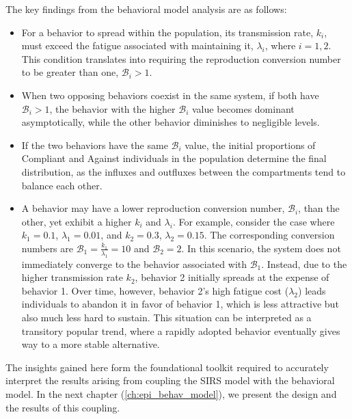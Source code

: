 The key findings from the behavioral model analysis are as follows:  
\begin{itemize}
	\item For a behavior to spread within the population, its transmission rate, \( k_i \), must exceed the fatigue associated with maintaining it, \( \lambda_i \), where \( i = 1, 2 \). This condition translates into requiring the reproduction conversion number to be greater than one, \( \mathcal{B}_i > 1 \).  
	\item When two opposing behaviors coexist in the same system, if both have \( \mathcal{B}_i > 1 \), the behavior with the higher \( \mathcal{B}_i \) value becomes dominant asymptotically, while the other behavior diminishes to negligible levels.  
	\item If the two behaviors have the same \( \mathcal{B}_i \) value, the initial proportions of Compliant and Against individuals in the population determine the final distribution, as the influxes and outfluxes between the compartments tend to balance each other.  
	\item A behavior may have a lower reproduction conversion number, \( \mathcal{B}_i \), than the other, yet exhibit a higher \( k_i \) and \( \lambda_i \). For example, consider the case where \( k_1 = 0.1 \), \( \lambda_1 = 0.01 \), and \( k_2 = 0.3 \), \( \lambda_2 = 0.15 \). The corresponding conversion numbers are \( \mathcal{B}_1 = \frac{k_1}{\lambda_1} = 10 \) and \( \mathcal{B}_2 = 2 \). In this scenario, the system does not immediately converge to the behavior associated with \( \mathcal{B}_1 \). Instead, due to the higher transmission rate \( k_2 \), behavior 2 initially spreads at the expense of behavior 1. Over time, however, behavior 2's high fatigue cost (\( \lambda_2 \)) leads individuals to abandon it in favor of behavior 1, which is less attractive but also much less hard to sustain. This situation can be interpreted as a transitory popular trend, where a rapidly adopted behavior eventually gives way to a more stable alternative.  
\end{itemize}  

The insights gained here form the foundational toolkit required to accurately interpret the results arising from coupling the SIRS model with the behavioral model. In the next chapter (\ref{ch:epi_behav_model}), we present the design and the results of this coupling.
